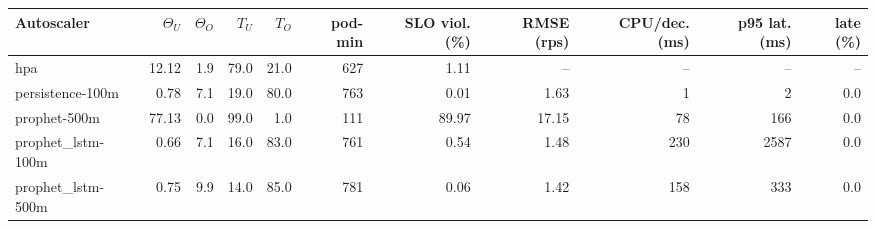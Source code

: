 \begin{tabular}{lrrrrrrrrrr}
\toprule
Autoscaler & $\Theta_U$ & $\Theta_O$ & $T_U$ & $T_O$ & pod-min & SLO viol. (\%) & RMSE (rps) & CPU/dec. (ms) & p95 lat. (ms) & late (\%) \\
\midrule
hpa & 12.12 & 1.9 & 79.0 & 21.0 & 627 & 1.11 & -- & -- & -- & -- \\
persistence-100m & 0.78 & 7.1 & 19.0 & 80.0 & 763 & 0.01 & 1.63 & 1 & 2 & 0.0 \\
prophet-500m & 77.13 & 0.0 & 99.0 & 1.0 & 111 & 89.97 & 17.15 & 78 & 166 & 0.0 \\
prophet\_lstm-100m & 0.66 & 7.1 & 16.0 & 83.0 & 761 & 0.54 & 1.48 & 230 & 2587 & 0.0 \\
prophet\_lstm-500m & 0.75 & 9.9 & 14.0 & 85.0 & 781 & 0.06 & 1.42 & 158 & 333 & 0.0 \\
\bottomrule
\end{tabular}
